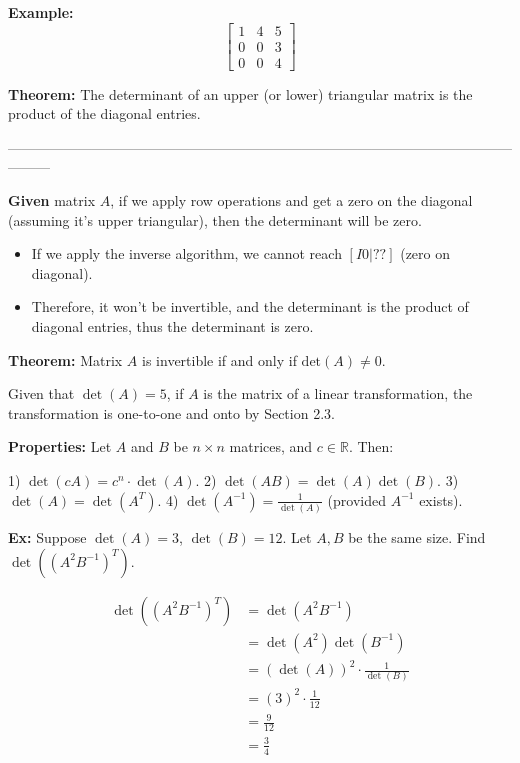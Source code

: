 \documentclass{article}
\begin{document}
\textbf{Example:} 
\[
\begin{bmatrix}
1 & 4 & 5 \\
0 & 0 & 3 \\
0 & 0 & 4
\end{bmatrix}
\]

\textbf{Theorem:} The determinant of an upper (or lower) triangular matrix is the product of the diagonal entries.

---------------------------------------------------------------------------------------------------------------------

\textbf{Given} matrix \( A \), if we apply row operations and get a zero on the diagonal (assuming it's upper triangular), then the determinant will be zero.

\begin{itemize}
    \item If we apply the inverse algorithm, we cannot reach \( [I0 | ??] \) (zero on diagonal).
    \item Therefore, it won't be invertible, and the determinant is the product of diagonal entries, thus the determinant is zero.
\end{itemize}

\textbf{Theorem:} Matrix \( A \) is invertible if and only if \( \text{det}(A) \neq 0 \).

Given that $\det(A) = 5$, if $A$ is the matrix of a linear transformation, the transformation is one-to-one and onto by Section 2.3.

\medskip

\textbf{Properties:} Let \( A \) and \( B \) be \( n \times n \) matrices, and \( c \in \mathbb{R} \). Then:

1) \( \det(cA) = c^n \cdot \det(A) \).
2) \( \det(AB) = \det(A)\det(B) \).
3) \( \det(A) = \det(A^T) \).
4) \( \det(A^{-1}) = \frac{1}{\det(A)} \) (provided \( A^{-1} \) exists).

\medskip

\textbf{Ex:} Suppose \( \det(A) = 3 \), \( \det(B) = 12 \). Let \( A, B \) be the same size. Find \( \det((A^2B^{-1})^T) \).

\[
\begin{aligned}
\det((A^2B^{-1})^T) &= \det(A^2B^{-1}) \\
&= \det(A^2)\det(B^{-1}) \\
&= (\det(A))^2 \cdot \frac{1}{\det(B)} \\
&= (3)^2 \cdot \frac{1}{12} \\
&= \frac{9}{12} \\
&= \frac{3}{4}
\end{aligned}
\]
\end{document}
